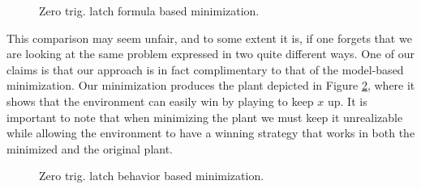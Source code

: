 \begin{figure}[bt]
\centering
\SmallPicture
{}
\vspace*{-2mm}
\caption{Zero trig. latch formula based minimization.}
\label{fig:fig.neg-trigger-latch-behavior-formula-minimization}
\vspace*{-4mm}
\MediumPicture
\end{figure}
This comparison may seem unfair, and to some extent it is, if one
forgets that we are looking at the same problem expressed in two
quite different ways.  One of our claims is that our approach is in
fact complimentary to that of the model-based minimization.
Our minimization produces the plant depicted in Figure 
\ref{fig:fig.neg-trigger-latch-behavior-minimization}, where it
shows that the environment can easily win by playing to keep
$x$ up.  
It is important to note that when minimizing the plant we must
keep it unrealizable while allowing the environment to have
a winning strategy that works in both the minimized and the original
plant.
\begin{figure}[bt]
\centering
\SmallPicture
{}
\vspace*{-2mm}
\caption{Zero trig. latch behavior based minimization.}
\label{fig:fig.neg-trigger-latch-behavior-minimization}
\vspace*{-4mm}
\MediumPicture
\end{figure}
